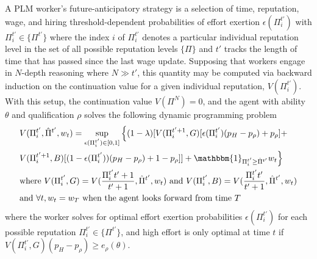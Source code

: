 \documentclass[sigconf]{acmart}
\theoremstyle{definition}
\begin{document}
A PLM worker's future-anticipatory strategy is a selection of time, reputation, wage, and hiring threshold-dependent probabilities of effort exertion $\epsilon(\Pi_i^{t'})$ with $\Pi_i^{t'} \in \{\Pi^{t'}\}$ where the index $i$ of $\Pi_i^{t'}$ denotes a particular individual reputation level in the set of all possible reputation levels $\{\Pi\}$ and $t'$ tracks the length of time that has passed since the last wage update.
Supposing that workers engage in $N$-depth reasoning where $N \gg t'$, this quantity may be computed via backward induction on the continuation value for a given individual reputation, $V(\Pi^{t'}_i)$. With this setup, the continuation value $V(\Pi^N) = 0$, and the agent with ability $\theta $ and qualification $\rho$ solves the following dynamic programming problem
\begin{align}
&V(\Pi^{t'}_i, \hat{\Pi}^{t'}, w_t) = \sup_{\epsilon(\Pi^{t'}_i) \in [0,1]} \Big\{(1- \lambda)[V(\Pi^{t'+1}_i, G) [\epsilon(\Pi^{t'}_i)(p_H-p_\rho) + p_\rho]+ \nonumber 
\\
&V(\Pi^{t'+1}_i,B)[(1-\epsilon(\Pi^{t'}_i))(p_H-p_\rho)+1-p_\rho]] + \mathbbm{1}_{\Pi^{t'}_i \ge \hat{\Pi}^{t'}}w_t\Big\} \nonumber
\\
&\text{where } V(\Pi^{t'}_i, G) = V(\frac{\Pi^{t'}_i t'+1}{t'+1}, \hat{\Pi}^{t'}, w_t) \text{ and } V(\Pi^{t'}_i, B) = V(\frac{\Pi^{t'}_i t'}{t'+1},\hat{\Pi}^{t'}, w_t) \nonumber
\\
&\text{and } \forall t, w_t = w_T \text{ when the agent looks forward from time $T$} \nonumber
\end{align}
where the worker solves for optimal effort exertion probabilities $\epsilon(\Pi^{t'}_i)$ for each possible reputation $\Pi^{t'}_i \in \{\Pi^{t'}\}$, and high effort is only optimal at time $t$ if $V(\Pi^{t'}_i, G)(p_H-p_\rho) \ge e_\rho(\theta)$. 
\end{document}
